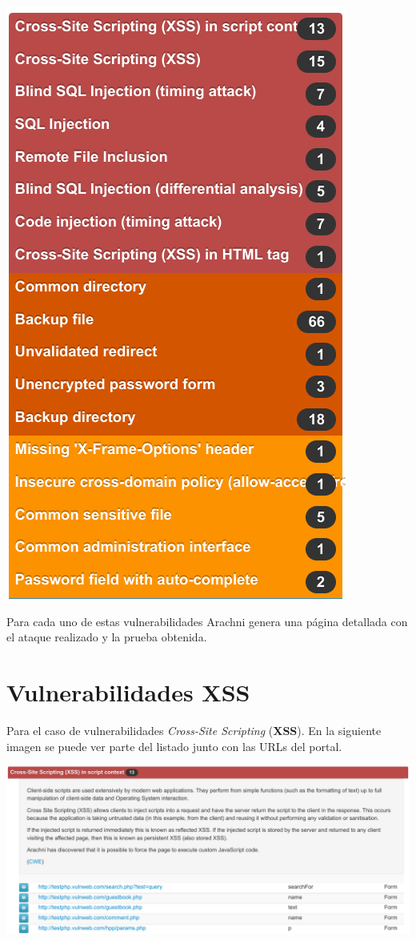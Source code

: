 \documentclass{\ClassPath/viu-tfm-template}
\begin{document}
\begin{center}
    \includegraphics[width=0.5\linewidth]{img/lista.png}
\end{center}
\vspace{-20pt}

Para cada uno de estas vulnerabilidades Arachni genera una página detallada con el ataque realizado y la prueba obtenida.

\hypertarget{vulnerabilidad_xss}{}
\chapter{Vulnerabilidades XSS}
Para el caso de vulnerabilidades \textit{Cross-Site Scripting} (\textbf{XSS}). En la siguiente imagen se puede ver parte del listado junto con las URLs del portal.

\begin{center}
    \vspace{-9pt}
    \includegraphics[frame,width=0.8\linewidth]{img/lista_xss.png}
\end{center}
\end{document}
